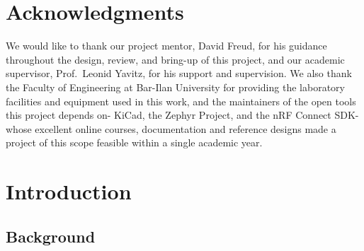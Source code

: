 \documentclass[12pt, a4paper]{article}
\begin{document}
\newpage
\section*{Acknowledgments}

We would like to thank our project mentor, David Freud, for his guidance
throughout the design, review, and bring-up of this project, and our academic
supervisor, Prof.\ Leonid Yavitz, for his support and supervision. We also thank
the Faculty of Engineering at Bar-Ilan University for providing the laboratory
facilities and equipment used in this work, and the maintainers of the open
tools this project depends on- KiCad, the Zephyr Project, and the nRF Connect
SDK- whose excellent online courses, documentation and reference designs made a project of this scope
feasible within a single academic year.

\newpage
\tableofcontents
\newpage

\newpage
\section{Introduction}

\subsection{Background}
\end{document}
